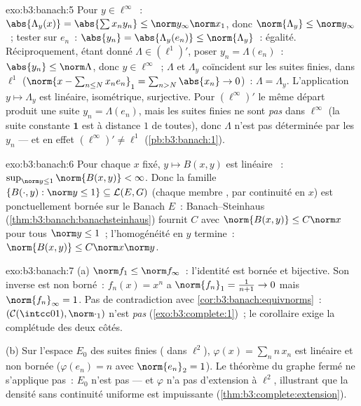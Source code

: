\begin{solution}{exo:b3:banach:5}
Pour $y \in \ell^\infty$~: $\abs{\Lambda_y(x)} =
\abs{\sum x_ny_n} \leq \norm y_\infty\norm x_1$, donc
$\norm{\Lambda_y} \leq \norm y_\infty$~; tester sur $e_n$~:
$\abs{y_n} = \abs{\Lambda_y(e_n)} \leq \norm{\Lambda_y}$~:
égalité. Réciproquement, étant donné $\Lambda \in
(\ell^1)'$, poser $y_n = \Lambda(e_n)$~: $\abs{y_n} \leq
\norm\Lambda$, donc $y \in \ell^\infty$~; $\Lambda$ et
$\Lambda_y$ coïncident sur les suites finies,  dans
$\ell^1$ ($\norm{x - \sum_{n\leq N}x_ne_n}_1 =
\sum_{n>N}\abs{x_n} \to 0$)~: $\Lambda = \Lambda_y$.
L'application $y \mapsto \Lambda_y$ est linéaire, isométrique,
surjective. Pour $(\ell^\infty)'$ le même départ produit une
suite $y_n = \Lambda(e_n)$, mais les suites finies ne sont
\emph{pas}  dans $\ell^\infty$ (la suite constante
$\mathbf 1$ est à distance $1$ de toutes), donc $\Lambda$
n'est pas déterminée par les $y_n$ --- et en effet
$(\ell^\infty)' \neq \ell^1$ (\cref{pb:b3:banach:1}).
\end{solution}

\begin{solution}{exo:b3:banach:6}
Pour chaque $x$ fixé, $y \mapsto B(x, y)$ est linéaire
~: $\sup_{\norm y \leq 1}\norm{B(x,y)} < \infty$.
Donc la famille $\{B(\cdot, y) : \norm y \leq 1\} \subseteq
\mathcal L(E, G)$ (chaque membre , par continuité en
$x$) est ponctuellement bornée sur le Banach $E$~:
Banach--Steinhaus (\cref{thm:b3:banach:banachsteinhaus})
fournit $C$ avec $\norm{B(x,y)} \leq C\norm x$ pour tous
$\norm y \leq 1$~; l'homogénéité en $y$ termine~:
$\norm{B(x,y)} \leq C\norm x\norm y$.
\end{solution}

\begin{solution}{exo:b3:banach:7}
(a) $\norm f_1 \leq \norm f_\infty$~: l'identité est bornée et
bijective. Son inverse est non borné~: $f_n(x) = x^n$ a
$\norm{f_n}_1 = \frac1{n+1} \to 0$ mais $\norm{f_n}_\infty =
1$. Pas de contradiction avec
\cref{cor:b3:banach:equivnorms}~: $(\mathcal C(\intcc01),
\norm\cdot_1)$ n'est \emph{pas} 
(\cref{exo:b3:complete:1})~; le corollaire exige la
complétude des deux côtés.

(b) Sur l'espace $E_0$ des suites finies ( dans
$\ell^2$), $\varphi(x) = \sum_n n\,x_n$ est linéaire et non
bornée ($\varphi(e_n) = n$ avec $\norm{e_n}_2 = 1$). Le
théorème du graphe fermé ne s'applique pas~: $E_0$ n'est pas
 --- et $\varphi$ n'a pas d'extension  à
$\ell^2$, illustrant que la densité sans continuité uniforme
est impuissante (\cref{thm:b3:complete:extension}).
\end{solution}

